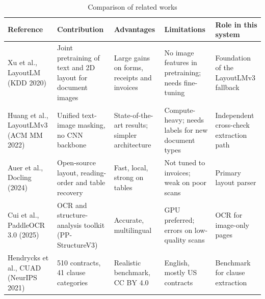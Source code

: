 \begin{table}[!htbp]
\centering
\footnotesize
\sloppy
\renewcommand{\arraystretch}{1.2}
\caption{Comparison of related works}\label{tab:related}
\begin{tabular}{|p{}|p{}|p{}|p{}|p{}|}
\hline
\raggedright \textbf{Reference} & \raggedright \textbf{Contribution} & \raggedright \textbf{Advantages} & \raggedright \textbf{Limitations} & \raggedright \textbf{Role in this system} \tabularnewline \hline
\raggedright Xu et al., LayoutLM (KDD 2020) \cite{xu2020layoutlm} & \raggedright Joint pretraining of text and 2D layout for document images & \raggedright Large gains on forms, receipts and invoices & \raggedright No image features in pretraining; needs fine-tuning & \raggedright Foundation of the LayoutLMv3 fallback \tabularnewline \hline
\raggedright Huang et al., LayoutLMv3 (ACM MM 2022) \cite{huang2022layoutlmv3} & \raggedright Unified text-image masking, no CNN backbone & \raggedright State-of-the-art results; simpler architecture & \raggedright Compute-heavy; needs labels for new document types & \raggedright Independent cross-check extraction path \tabularnewline \hline
\raggedright Auer et al., Docling (2024) \cite{auer2024docling} & \raggedright Open-source layout, reading-order and table recovery & \raggedright Fast, local, strong on tables & \raggedright Not tuned to invoices; weak on poor scans & \raggedright Primary layout parser \tabularnewline \hline
\raggedright Cui et al., PaddleOCR 3.0 (2025) \cite{cui2025paddleocr} & \raggedright OCR and structure-analysis toolkit (PP-StructureV3) & \raggedright Accurate, multilingual & \raggedright GPU preferred; errors on low-quality scans & \raggedright OCR for image-only pages \tabularnewline \hline
\raggedright Hendrycks et al., CUAD (NeurIPS 2021) \cite{hendrycks2021cuad} & \raggedright 510 contracts, 41 clause categories & \raggedright Realistic benchmark, CC BY 4.0 & \raggedright English, mostly US contracts & \raggedright Benchmark for clause extraction \tabularnewline \hline
\end{tabular}
\end{table}

